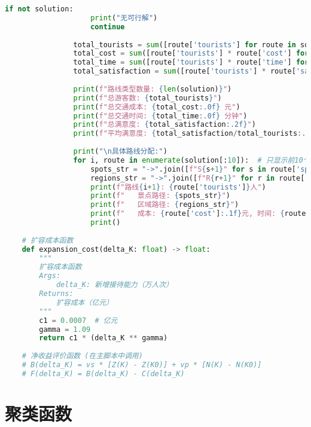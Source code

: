 \begin{lstlisting}[language=Python]
                if not solution:
                    print("无可行解")
                    continue
                
                total_tourists = sum([route['tourists'] for route in solution])
                total_cost = sum([route['tourists'] * route['cost'] for route in solution])
                total_time = sum([route['tourists'] * route['time'] for route in solution])
                total_satisfaction = sum([route['tourists'] * route['satisfaction'] for route in solution])
                
                print(f"路线类型数量: {len(solution)}")
                print(f"总游客数: {total_tourists}")
                print(f"总交通成本: {total_cost:.0f} 元")
                print(f"总交通时间: {total_time:.0f} 分钟")
                print(f"总满意度: {total_satisfaction:.2f}")
                print(f"平均满意度: {total_satisfaction/total_tourists:.2f}")
                
                print("\n具体路线分配:")
                for i, route in enumerate(solution[:10]):  # 只显示前10个
                    spots_str = "->".join([f"S{s+1}" for s in route['spots']])
                    regions_str = "->".join([f"R{r+1}" for r in route['regions']])
                    print(f"路线{i+1}: {route['tourists']}人")
                    print(f"   景点路径: {spots_str}")
                    print(f"   区域路径: {regions_str}")
                    print(f"   成本: {route['cost']:.1f}元, 时间: {route['time']:.1f}分钟, 偏好: {route['preference']}")
                    print()
    
    # 扩容成本函数
    def expansion_cost(delta_K: float) -> float:
        """
        扩容成本函数
        Args:
            delta_K: 新增接待能力（万人次）
        Returns:
            扩容成本（亿元）
        """
        c1 = 0.0007  # 亿元
        gamma = 1.09
        return c1 * (delta_K ** gamma)
    
    # 净收益评价函数 (在主脚本中调用)
    # B(delta_K) = vs * [Z(K) - Z(K0)] + vp * [N(K) - N(K0)]
    # F(delta_K) = B(delta_K) - C(delta_K)

\end{lstlisting}

\section[\hspace{-2pt}聚类函数]{{\heiti{} \hspace{-8pt}聚类函数}}

